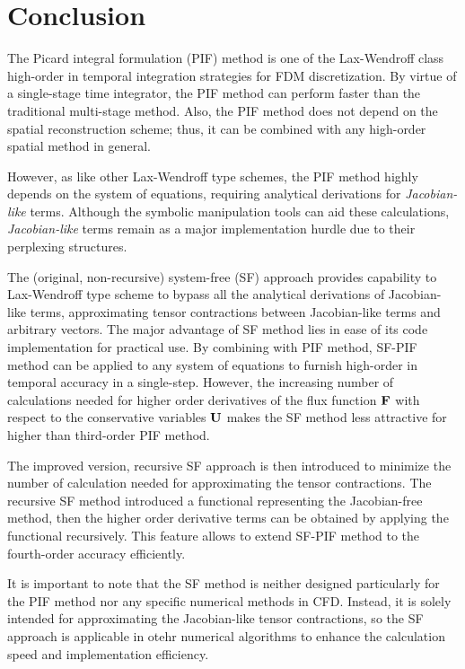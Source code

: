 \section{Conclusion}\label{sec:sf_conclusion}

The Picard integral formulation (PIF) method is one of the Lax-Wendroff class
high-order in temporal integration strategies for FDM discretization.
By virtue of a single-stage time integrator, the PIF method can perform
faster than the traditional multi-stage method.
Also, the PIF method does not depend on the spatial reconstruction scheme;
thus, it can be combined with any high-order spatial method in general.

However, as like other Lax-Wendroff type schemes,
the PIF method highly depends on the system of equations,
requiring analytical derivations for \textit{Jacobian-like} terms.
Although the symbolic manipulation tools can aid these calculations,
\textit{Jacobian-like} terms remain as a major implementation hurdle due to their perplexing structures.

The (original, non-recursive) system-free (SF) approach provides capability
to Lax-Wendroff type scheme to bypass all the analytical derivations of Jacobian-like terms,
approximating tensor contractions between Jacobian-like terms and arbitrary vectors.
The major advantage of SF method lies in ease of its code implementation for practical use.
By combining with PIF method, SF-PIF method can be applied to any system of equations
to furnish high-order in temporal accuracy in a single-step.
However, the increasing number of calculations needed for
higher order derivatives of the flux function \( \mathbf{F} \) with respect to the conservative variables \( \mathbf{U} \)
makes the SF method less attractive for higher than third-order PIF method.

The improved version, recursive SF approach is then introduced to minimize
the number of calculation needed for approximating the tensor contractions.
The recursive SF method introduced a functional representing the Jacobian-free method,
then the higher order derivative terms can be obtained by applying the functional recursively.
This feature allows to extend SF-PIF method to the fourth-order accuracy efficiently.

It is important to note that the SF method is neither designed particularly for the PIF method
nor any specific numerical methods in CFD.
Instead, it is solely intended for approximating the Jacobian-like tensor contractions,
so the SF approach is applicable in otehr numerical algorithms
to enhance the calculation speed and implementation efficiency.
